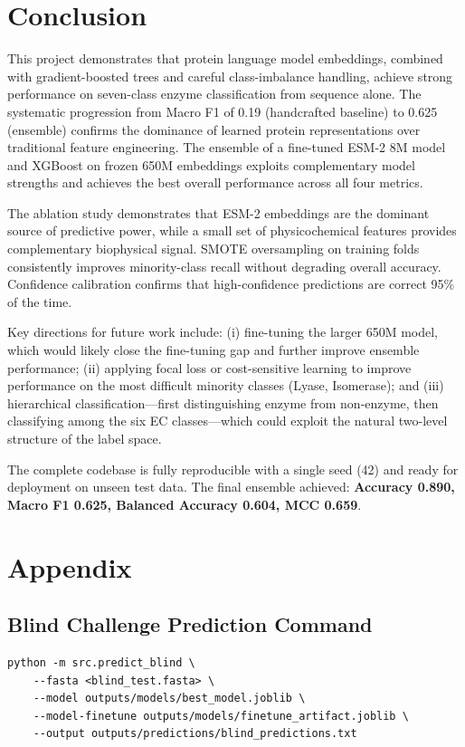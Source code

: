 \documentclass[11pt,a4paper]{article}
\begin{document}
\section{Conclusion}
This project demonstrates that protein language model embeddings, combined with
gradient-boosted trees and careful class-imbalance handling, achieve strong performance
on seven-class enzyme classification from sequence alone.
The systematic progression from Macro F1 of 0.19 (handcrafted baseline) to 0.625 (ensemble)
confirms the dominance of learned protein representations over traditional feature engineering.
The ensemble of a fine-tuned ESM-2 8M model and XGBoost on frozen 650M embeddings exploits
complementary model strengths and achieves the best overall performance across all four metrics.

The ablation study demonstrates that ESM-2 embeddings are the dominant source of predictive
power, while a small set of physicochemical features provides complementary biophysical signal.
SMOTE oversampling on training folds consistently improves minority-class recall without
degrading overall accuracy.
Confidence calibration confirms that high-confidence predictions are correct 95\% of the time.

Key directions for future work include: (i) fine-tuning the larger 650M model, which would
likely close the fine-tuning gap and further improve ensemble performance; (ii) applying focal
loss or cost-sensitive learning to improve performance on the most difficult minority classes
(Lyase, Isomerase); and (iii) hierarchical classification---first distinguishing enzyme from
non-enzyme, then classifying among the six EC classes---which could exploit the natural
two-level structure of the label space.

The complete codebase is fully reproducible with a single seed (42) and ready for deployment
on unseen test data.
The final ensemble achieved:
\textbf{Accuracy 0.890, Macro F1 0.625, Balanced Accuracy 0.604, MCC 0.659}.

\section{Appendix}
\subsection{Blind Challenge Prediction Command}
\begin{verbatim}
python -m src.predict_blind \
    --fasta <blind_test.fasta> \
    --model outputs/models/best_model.joblib \
    --model-finetune outputs/models/finetune_artifact.joblib \
    --output outputs/predictions/blind_predictions.txt
\end{verbatim}
\end{document}
